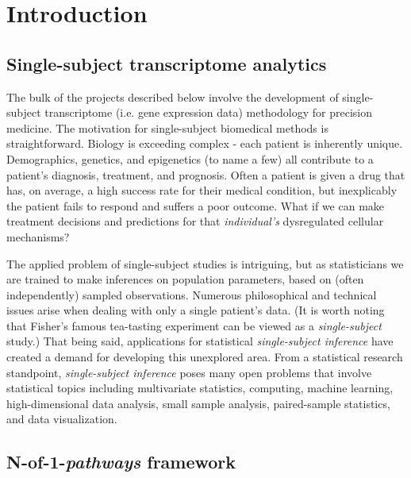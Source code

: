 \chapter{Introduction}\label{Chap:Intro}

\section{Single-subject transcriptome analytics}\label{sec:nof1}

\indent \indent The bulk of the projects described below involve the development of single-subject transcriptome (i.e. gene expression data) methodology for precision medicine. The motivation for single-subject biomedical methods is straightforward. Biology is exceeding complex - each patient is inherently unique. Demographics, genetics, and epigenetics (to name a few) all contribute to a patient's diagnosis, treatment, and prognosis. Often a patient is given a drug that has, on average, a high success rate for their medical condition, but inexplicably the patient fails to respond and suffers a poor outcome. What if we can make treatment decisions and predictions for that \emph{individual's} dysregulated cellular mechanisms? 

The applied problem of single-subject studies is intriguing, but as statisticians we are trained to make inferences on population parameters, based on (often independently) sampled observations. Numerous philosophical and technical issues arise when dealing with only a single patient's data. (It is worth noting that Fisher's famous tea-tasting experiment can be viewed as a \emph{single-subject} study.) That being said, applications for statistical \emph{single-subject inference} have created a demand for developing this unexplored area. From a statistical research standpoint, \emph{single-subject inference} poses many open problems that involve statistical topics including multivariate statistics, computing, machine learning, high-dimensional data analysis, small sample analysis, paired-sample statistics, and data visualization.

\section{N-of-1-\emph{pathways} framework}\label{sec:nof1pathways}

